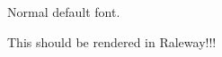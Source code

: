 \documentclass{article}
\begin{document}
Normal default font.

{\colonna This should be rendered in Raleway!!!}
\end{document}
